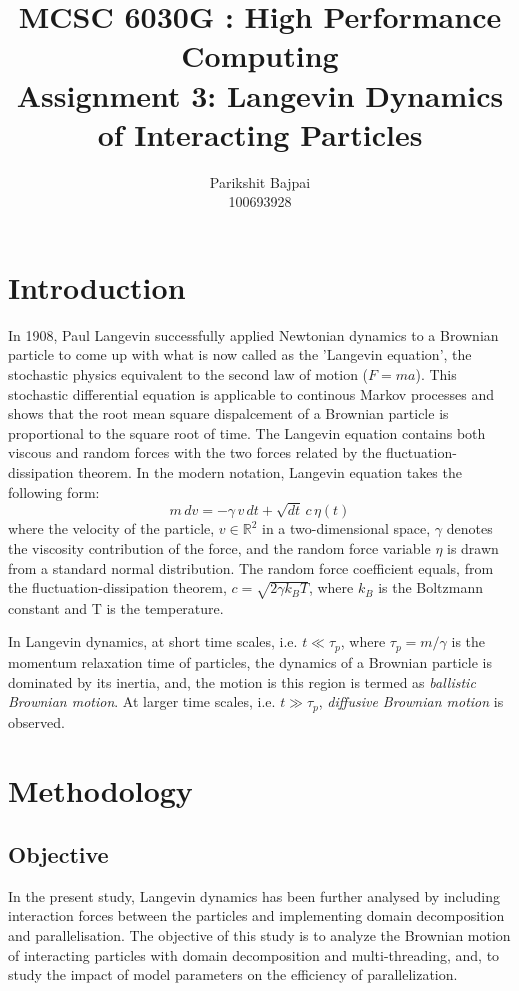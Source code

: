\documentclass[11pt, oneside]{article}
\title{MCSC 6030G : High Performance Computing \\ Assignment 3: Langevin Dynamics of Interacting Particles}
\author{Parikshit Bajpai \\ 100693928}
\date{}							%
\begin{document}
\maketitle

\section{Introduction}
In 1908, Paul Langevin successfully applied Newtonian dynamics to a Brownian particle to come up with what is now called as the 'Langevin equation', the stochastic physics equivalent to the second law of motion (\(F=ma\)). This stochastic differential equation is applicable to continous Markov processes and shows that the root mean square dispalcement of a Brownian particle is proportional to the square root of time. The Langevin equation contains both viscous and random forces with the two forces related by the fluctuation-dissipation theorem. In the modern notation, Langevin equation takes the following form:     
  \begin{equation} \label{Langevin}
    m\,dv = - \gamma\,v\,dt + \sqrt{dt}\,c\,\eta(t) 
  \end{equation}
  where the velocity of the particle, \(v \in \mathbb{R}^2\) in a two-dimensional space, \(\gamma\)  denotes the viscosity contribution of the force, and the random force variable \(\eta\) is drawn from a standard normal distribution. The random force  coefficient equals, from the fluctuation-dissipation theorem, \(c = \sqrt{2 \gamma k_B T}\), where \(k_B\) is the Boltzmann constant and T is the temperature.

In Langevin dynamics, at short time scales, i.e. \(t \ll \tau_p \), where \(\tau_p =  m / \gamma \) is the momentum relaxation time of particles, the dynamics of a Brownian particle is dominated by its inertia, and, the motion is this region is termed as \textit{ballistic Brownian motion}. At larger time scales, i.e.  \(t \gg  \tau_p\), \textit{diffusive Brownian motion} is observed.
  
\section{Methodology}
   \subsection{Objective}
In the present study, Langevin dynamics has been further analysed by including interaction forces between the particles and implementing domain decomposition and parallelisation. The objective of this study is to analyze the Brownian motion of interacting particles with domain decomposition and multi-threading, and, to study the impact of model parameters on the efficiency of parallelization.
\end{document}

